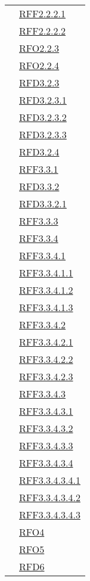 \begin{longtable}{|>{\centering}m{5cm}|m{5cm}<{\centering}|}
& \hyperlink{RFF2.2.2.1}{RFF2.2.2.1}\\
& \hyperlink{RFF2.2.2.2}{RFF2.2.2.2}\\
& \hyperlink{RFO2.2.3}{RFO2.2.3}\\
& \hyperlink{RFO2.2.4}{RFO2.2.4}\\
& \hyperlink{RFD3.2.3}{RFD3.2.3}\\
& \hyperlink{RFD3.2.3.1}{RFD3.2.3.1}\\
& \hyperlink{RFD3.2.3.2}{RFD3.2.3.2}\\
& \hyperlink{RFD3.2.3.3}{RFD3.2.3.3}\\
& \hyperlink{RFD3.2.4}{RFD3.2.4}\\
& \hyperlink{RFF3.3.1}{RFF3.3.1}\\
& \hyperlink{RFD3.3.2}{RFD3.3.2}\\
& \hyperlink{RFD3.3.2.1}{RFD3.3.2.1}\\
& \hyperlink{RFF3.3.3}{RFF3.3.3}\\
& \hyperlink{RFF3.3.4}{RFF3.3.4}\\
& \hyperlink{RFF3.3.4.1}{RFF3.3.4.1}\\
& \hyperlink{RFF3.3.4.1.1}{RFF3.3.4.1.1}\\
& \hyperlink{RFF3.3.4.1.2}{RFF3.3.4.1.2}\\
& \hyperlink{RFF3.3.4.1.3}{RFF3.3.4.1.3}\\
& \hyperlink{RFF3.3.4.2}{RFF3.3.4.2}\\
& \hyperlink{RFF3.3.4.2.1}{RFF3.3.4.2.1}\\
& \hyperlink{RFF3.3.4.2.2}{RFF3.3.4.2.2}\\
& \hyperlink{RFF3.3.4.2.3}{RFF3.3.4.2.3}\\
& \hyperlink{RFF3.3.4.3}{RFF3.3.4.3}\\
& \hyperlink{RFF3.3.4.3.1}{RFF3.3.4.3.1}\\
& \hyperlink{RFF3.3.4.3.2}{RFF3.3.4.3.2}\\
& \hyperlink{RFF3.3.4.3.3}{RFF3.3.4.3.3}\\
& \hyperlink{RFF3.3.4.3.4}{RFF3.3.4.3.4}\\
& \hyperlink{RFF3.3.4.3.4.1}{RFF3.3.4.3.4.1}\\
& \hyperlink{RFF3.3.4.3.4.2}{RFF3.3.4.3.4.2}\\
& \hyperlink{RFF3.3.4.3.4.3}{RFF3.3.4.3.4.3}\\
& \hyperlink{RFO4}{RFO4}\\
& \hyperlink{RFO5}{RFO5}\\
& \hyperlink{RFD6}{RFD6}\\

\end{longtable}
